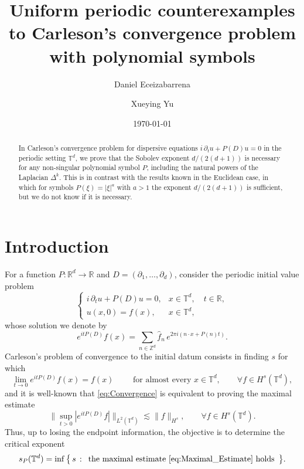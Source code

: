 \documentclass[11pt,reqno]{amsart}
\title{Uniform periodic counterexamples to Carleson's convergence problem with polynomial symbols
}
\author{Daniel Eceizabarrena}
\author{Xueying Yu}
\date{\today}
\theoremstyle{definition}
\numberwithin{equation}{section}
\theoremstyle{remark}
\begin{document}
\begin{abstract}
In Carleson's convergence problem for dispersive equations 
$i\, \partial_t u + P(D)u=0$ in the periodic setting $\mathbb T^d$, we prove that
the Sobolev exponent $d/(2(d+1))$ is necessary for any non-singular polynomial symbol $P$, including the natural powers of the Laplacian $\Delta^k$.
This is in contrast with the results known in the Euclidean case, in which for symbols $P(\xi) = |\xi|^a$ with $a > 1$
the exponent $d/(2(d+1))$ is sufficient, 
but we do not know if it is necessary. 
\end{abstract}

\maketitle




\section{Introduction}


For a function $P: \mathbb R^d \to \mathbb R$ and $D = (\partial_1, \ldots, \partial_d)$, 
consider the periodic initial value problem 
\begin{equation}\label{eq:Equation}
\left\{ \begin{array}{ll}
i \, \partial_t u  + P(D) u = 0, & x \in  \mathbb T^d, \quad t \in \mathbb R, \\
u(x,0) = f(x), & x \in  \mathbb T^d,
\end{array}
\right.
\end{equation}
whose solution we denote by 
\begin{equation}\label{eq:PeriodicSolution}
    e^{itP(D)}f(x) = \sum_{n \in \mathbb Z^d} \widehat f_n\, e^{2\pi i (n \cdot x + P(n)t)}.
\end{equation}
Carleson's problem of convergence to the initial datum consists in finding $s$ for which
\begin{equation}\label{eq:Convergence}
\lim_{t \to 0} e^{itP(D)}f(x) = f(x) \qquad \text{ for almost every } x \in \mathbb T^d, \qquad \forall f \in H^s(\mathbb T^d), 
\end{equation}
and it is well-known that \eqref{eq:Convergence} is equivalent to proving the maximal estimate
\begin{equation}\label{eq:Maximal_Estimate}
\big\lVert   \sup_{t > 0} |e^{itP(D)}f| \big\rVert_{L^2(\mathbb T^d)} \lesssim \lVert f \rVert_{H^s}, \qquad \forall f \in H^s(\mathbb T^d).
\end{equation}
Thus, up to losing the endpoint information, the objective is to determine the critical exponent
\begin{equation}\label{eq:CriticalExponentMax}
s_P(\mathbb T^d) = \inf \big\{ \, s \, : \, \text{ the maximal estimate } \eqref{eq:Maximal_Estimate} \text{ holds }  \,   \big\}. 
\end{equation}
\end{document}
